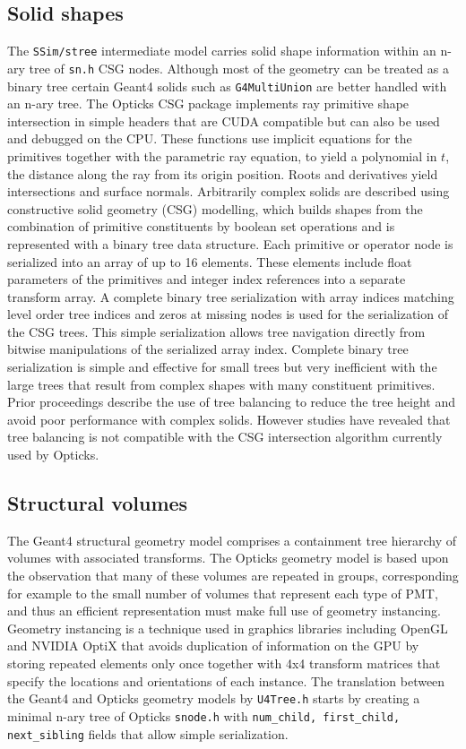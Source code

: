 \documentclass{webofc}
\begin{document}
\subsection{Solid shapes}%
%
The {\tt SSim/stree} intermediate model carries solid shape information
within an n-ary tree of {\tt sn.h} CSG nodes. Although most of the geometry 
can be treated as a binary tree certain Geant4 solids such as {\tt G4MultiUnion}
are better handled with an n-ary tree.   
%
The Opticks CSG package implements ray primitive shape intersection in simple headers that 
are CUDA compatible but can also be used and debugged on the CPU.
These functions use implicit equations for the primitives together with 
the parametric ray equation, to yield a polynomial in $t$, the distance along the ray from its origin position. 
Roots and derivatives yield intersections and surface normals.
%
Arbitrarily complex solids are described using constructive solid geometry (CSG) modelling, 
which builds shapes from the combination of primitive constituents by boolean set operations
and is represented with a binary tree data structure.
%
Each primitive or operator node is serialized into an array of up to 16 elements. 
These elements include float parameters of the primitives and integer index references 
into a separate transform array. 
A complete binary tree serialization with array indices matching level order tree indices
and zeros at missing nodes is used for the serialization of the CSG trees. This simple 
serialization allows tree navigation directly from bitwise manipulations of the serialized array index.
%
Complete binary tree serialization is simple and effective for small trees but very inefficient 
with the large trees that result from complex shapes with many constituent primitives. 
Prior proceedings\cite{chep2018} describe the use of tree balancing to reduce the  
tree height and avoid poor performance with complex solids. However studies have revealed that 
tree balancing is not compatible with the CSG intersection algorithm currently used by Opticks. 
%
%
\subsection{Structural volumes}%
%
The Geant4 structural geometry model comprises a containment tree hierarchy of volumes with associated transforms.
The Opticks geometry model is based upon the observation that many of these volumes are 
repeated in groups, corresponding for example to the small number of volumes that represent each type of PMT, 
and thus an efficient representation must make full use of geometry instancing. 
Geometry instancing is a technique used in graphics libraries including OpenGL and NVIDIA OptiX that 
avoids duplication of information on the GPU by storing repeated elements only once together 
with 4x4 transform matrices that specify the locations and orientations of each instance.
%
The translation between the Geant4 and Opticks geometry models by {\tt U4Tree.h} 
starts by creating a minimal n-ary tree of Opticks {\tt snode.h} 
with {\tt num\_child, first\_child, next\_sibling} fields that allow simple serialization. 
\end{document}
